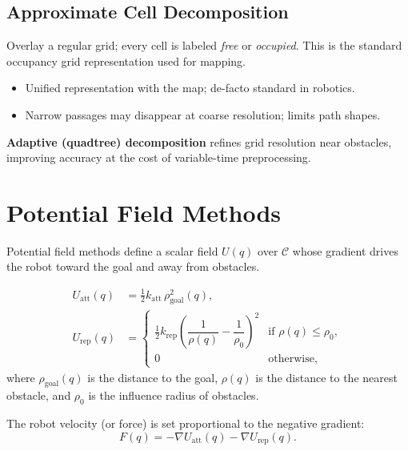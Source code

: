 \documentclass[11pt,a4paper]{article}
\theoremstyle{definition}
\theoremstyle{plain}
\theoremstyle{remark}
\begin{document}
\subsection{Approximate Cell Decomposition}

Overlay a regular grid; every cell is labeled \emph{free} or \emph{occupied}. This is the standard occupancy grid representation used for mapping.

\begin{itemize}
    \item[\textbf{+}] Unified representation with the map; de-facto standard in robotics.
    \item[\textbf{--}] Narrow passages may disappear at coarse resolution; limits path shapes.
\end{itemize}

\textbf{Adaptive (quadtree) decomposition} refines grid resolution near obstacles, improving accuracy at the cost of variable-time preprocessing.

\section{Potential Field Methods}

Potential field methods define a scalar field $U(q)$ over $\mathcal{C}$ whose gradient drives the robot toward the goal and away from obstacles.

\begin{tcolorbox}[colback=blue!5!white,colframe=blue!75!black,title=\textbf{Potential Field Components}]
\begin{align*}
    U_{\mathrm{att}}(q) &= \tfrac{1}{2} k_{\mathrm{att}}\,\rho_{\mathrm{goal}}^2(q), \\
    U_{\mathrm{rep}}(q) &=
    \begin{cases}
        \tfrac{1}{2} k_{\mathrm{rep}}\!\left(\dfrac{1}{\rho(q)} - \dfrac{1}{\rho_0}\right)^{\!2} & \text{if } \rho(q) \le \rho_0, \\[6pt] %
        0 & \text{otherwise,}
    \end{cases}
\end{align*}
where $\rho_{\mathrm{goal}}(q)$ is the distance to the goal, $\rho(q)$ is the distance to the nearest obstacle, and $\rho_0$ is the influence radius of obstacles.
\end{tcolorbox}

The robot velocity (or force) is set proportional to the negative gradient:
\[
    F(q) = -\nabla U_{\mathrm{att}}(q) - \nabla U_{\mathrm{rep}}(q).
\]
\end{document}
